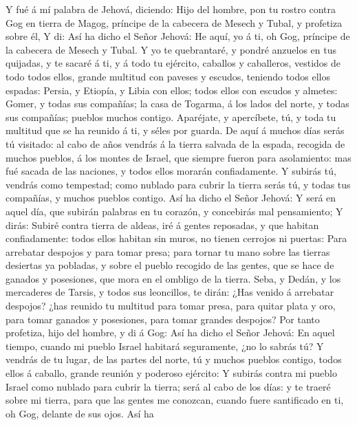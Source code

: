  Y fué á mí palabra de Jehová, diciendo:  Hijo
del hombre, pon tu rostro contra Gog en tierra de Magog, príncipe de la
cabecera de Mesech y Tubal, y profetiza sobre él,  Y di: Así
ha dicho el Señor Jehová: He aquí, yo á ti, oh Gog, príncipe de la
cabecera de Mesech y Tubal.  Y yo te quebrantaré, y pondré
anzuelos en tus quijadas, y te sacaré á ti, y á todo tu ejército,
caballos y caballeros, vestidos de todo todos ellos, grande multitud con
paveses y escudos, teniendo todos ellos espadas:  Persia, y
Etiopía, y Libia con ellos; todos ellos con escudos y almetes:
 Gomer, y todas sus compañías; la casa de Togarma, á los
lados del norte, y todas sus compañías; pueblos muchos contigo.
 Aparéjate, y apercíbete, tú, y toda tu multitud que se ha
reunido á ti, y séles por guarda.  De aquí á muchos días
serás tú visitado: al cabo de años vendrás á la tierra salvada de la
espada, recogida de muchos pueblos, á los montes de Israel, que siempre
fueron para asolamiento: mas fué sacada de las naciones, y todos ellos
morarán confiadamente.  Y subirás tú, vendrás como
tempestad; como nublado para cubrir la tierra serás tú, y todas tus
compañías, y muchos pueblos contigo.  Así ha dicho el Señor
Jehová: Y será en aquel día, que subirán palabras en tu corazón, y
concebirás mal pensamiento;  Y dirás: Subiré contra tierra
de aldeas, iré á gentes reposadas, y que habitan confiadamente: todos
ellos habitan sin muros, no tienen cerrojos ni puertas: 
Para arrebatar despojos y para tomar presa; para tornar tu mano sobre
las tierras desiertas ya pobladas, y sobre el pueblo recogido de las
gentes, que se hace de ganados y posesiones, que mora en el ombligo de
la tierra.  Seba, y Dedán, y los mercaderes de Tarsis, y
todos sus leoncillos, te dirán: ¿Has venido á arrebatar despojos? ¿has
reunido tu multitud para tomar presa, para quitar plata y oro, para
tomar ganados y posesiones, para tomar grandes despojos? 
Por tanto profetiza, hijo del hombre, y di á Gog: Así ha dicho el Señor
Jehová: En aquel tiempo, cuando mi pueblo Israel habitará seguramente,
¿no lo sabrás tú?  Y vendrás de tu lugar, de las partes del
norte, tú y muchos pueblos contigo, todos ellos á caballo, grande
reunión y poderoso ejército:  Y subirás contra mi pueblo
Israel como nublado para cubrir la tierra; será al cabo de los días: y
te traeré sobre mi tierra, para que las gentes me conozcan, cuando fuere
santificado en ti, oh Gog, delante de sus ojos.  Así ha
